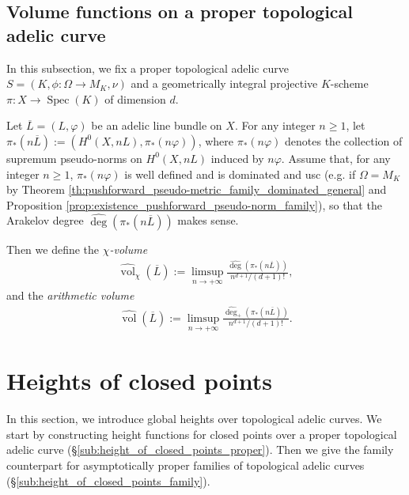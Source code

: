 \documentclass [11pt,reqno]{amsart}
\newcommand{\1}{\mathmybb{1}}
\def\Spec{\operatorname{Spec}}
\def\vol{\operatorname{vol}}
\begin{document}
\subsection{Volume functions on a proper topological adelic curve}
\label{sub:volume_functions_proper_tac}

In this subsection, we fix a proper topological adelic curve $S=(K,\phi:\Omega\to M_{K},\nu)$ and a geometrically integral projective $K$-scheme $\pi : X \to \Spec(K)$ of dimension $d$. 

\begin{definition}
\label{def:volume_function_proper_tac}
Let $\overline{L}=(L,\varphi)$ be an adelic line bundle on $X$. For any integer $n\geq 1$, let $\pi_{\ast}(n\overline{L}) := (H^{0}(X,nL),\pi_{\ast}(n\varphi))$, where $\pi_{\ast}(n\varphi)$ denotes the collection of supremum pseudo-norms on $H^{0}(X,nL)$ induced by $n\varphi$. Assume that, for any integer $n\geq 1$, $\pi_{\ast}(n\varphi)$ is well defined and is dominated and usc (e.g. if $\Omega=M_{K}$ by Theorem \ref{th:pushforward_pseudo-metric_family_dominated_general} and Proposition \ref{prop:existence_pushforward_pseudo-norm_family}), so that the Arakelov degree $\widehat{\deg}(\pi_{\ast}(n\overline{L}))$ makes sense. 

Then we define the $\chi$\emph{-volume}
\begin{align*}
\widehat{\vol}_{\chi}(\overline{L}) := \displaystyle\limsup_{n \to +\infty}\frac{\widehat{\deg}(\pi_{\ast}(n\overline{L}))}{n^{d+1}/(d+1)!},
\end{align*} 
and the \emph{arithmetic volume}
\begin{align*}
\widehat{\vol}(\overline{L}) := \displaystyle\limsup_{n \to +\infty}\frac{\widehat{\deg}_{+}(\pi_{\ast}(n\overline{L}))}{n^{d+1}/(d+1)!}.
\end{align*}
\end{definition}

\section{Heights of closed points}
\label{sec:global_heights}

In this section, we introduce global heights over topological adelic curves. We start by constructing height functions for closed points over a proper topological adelic curve (\S \ref{sub:height_of_closed_points_proper}). Then we give the family counterpart for asymptotically proper families of topological adelic curves (\S \ref{sub:height_of_closed_points_family}). 
\end{document}
